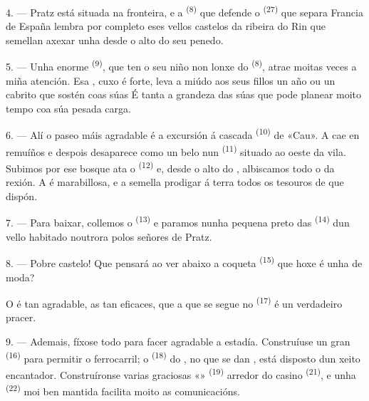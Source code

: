4. --- Pratz está situada na fronteira, e a 
\textsuperscript{(8)} que defende o  \textsuperscript{(27)} que
separa Francia de España lembra por completo eses vellos castelos da ribeira do Rin
que semellan axexar unha  desde o alto do seu penedo.

5. --- Unha enorme  \textsuperscript{(9)}, que ten o seu niño non lonxe
do  \textsuperscript{(8)}, atrae moitas veces a miña atención. Esa
, cuxo  é forte, leva a miúdo aos seus fillos un
año ou un cabrito que sostén coas súas  É tanta a grandeza das súas
 que pode planear moito tempo coa súa pesada carga.

\VUsaut{3.0mm}
\VUsaut{3.0mm}

6. --- Alí o paseo máis agradable é a excursión á cascada \textsuperscript{(10)} de
«Cau». A  cae en remuíños e despois desaparece como un belo
 nun  \textsuperscript{(11)} situado ao oeste
da vila. Subimos por ese bosque ata o 
\textsuperscript{(12)} e, desde o alto do , albiscamos todo o
 da rexión. A  é marabillosa, e a
 semella prodigar á terra todos os tesouros de que dispón.

7. --- Para baixar, collemos o  \textsuperscript{(13)} e paramos
nunha pequena  preto das  \textsuperscript{(14)} dun
vello  habitado noutrora polos señores de Pratz.

8. --- Pobre castelo! Que pensará ao ver abaixo a coqueta 
\textsuperscript{(15)} que hoxe é unha  de moda?

O  é tan agradable, as  tan eficaces, que a
 que se segue no  \textsuperscript{(17)} é un
verdadeiro pracer.

\VUsaut{3.0mm}
\VUsaut{3.0mm}

9. --- Ademais, fíxose todo para facer agradable a estadía. Construíuse un gran
 \textsuperscript{(16)} para permitir o ferrocarril; o
 \textsuperscript{(18)} do , no que se
dan , está disposto dun xeito encantador. Construíronse varias
graciosas «» \textsuperscript{(19)} arredor do casino
\textsuperscript{(21)}, e unha  \textsuperscript{(22)} moi ben
mantida facilita moito as comunicacións.

